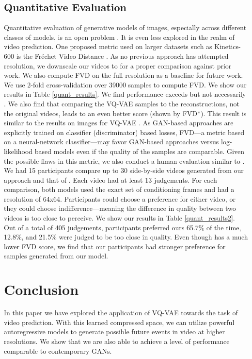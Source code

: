 \documentclass{article}
\begin{document}
\subsection{Quantitative Evaluation}
Quantitative evaluation of generative models of images, especially across different classes of models, is an open problem \cite{TheisOB15}. It is even less explored in the realm of video prediction. One proposed metric used on larger datasets such as Kinetics-600 is the Fr\'echet Video Distance \cite{Unterthiner18}. As no previous approach has attempted  resolution, we downscale our videos to  for a proper comparison against prior work. We also compute FVD on the full resolution as a baseline for future work. We use 2-fold cross-validation over 39000 samples to compute FVD. We show our results in Table \ref{quant_results}. We find performance exceeds \cite{clark2020adversarial} but not necessarily \cite{luc2020}. We also find that comparing the VQ-VAE samples to the reconstructions, not the original videos, leads to an even better score (shown by FVD*). This result is similar to the results on images for VQ-VAE \cite{RazaviOV19}. As GAN-based approaches are explicitly trained on classifier (discriminator) based losses, FVD---a metric based on a neural-network classifier---may favor GAN-based approaches versus log-likelihood based models even if the quality of the samples are comparable. Given the possible flaws in this metric, we also conduct a human evaluation similar to \cite{VondrickPT16}. We had 15 participants compare up to 30 side-by-side videos generated from our approach and that of \cite{luc2020}. Each video had at least 13 judgements. For each comparison, both models used the exact set of conditioning frames and had a resolution of 64x64. Participants could choose a preference for either video, or they could choose indifference---meaning the difference in quality between two videos is too close to perceive. We show our results in Table \ref{quant_results2}. Out of a total of 405 judgements, participants preferred ours 65.7\% of the time, \cite{luc2020} 12.8\%, and 21.5\% were judged to be too close in quality. Even though \cite{luc2020} has a much lower FVD score, we find that our participants had stronger preference for samples generated from our model. 
 \section{Conclusion}
In this paper we have explored the application of VQ-VAE towards the task of video prediction. With this learned compressed space, we can utilize powerful autoregressive models to generate possible future events in video at higher resolutions. We show that we are also able to achieve a level of performance comparable to contemporary GANs. 
\end{document}
